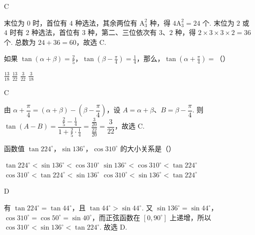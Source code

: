\begin{answer}
C
\end{answer}

\begin{solution}
末位为 \(0\) 时，首位有 \(4\) 种选法，其余两位有 \(\mathrm A_3^2\) 种，得 \(4\mathrm A_3^2=24\) 个. 末位为 \(2\) 或 \(4\) 时有 \(2\) 种选法，首位有 \(3\) 种，第二、三位依次有 \(3\)、\(2\) 种，得 \(2\times3\times3\times2=36\) 个. 总数为 \(24+36=60\)，故选 C.
\end{solution}

\begin{problem}
如果 \(\tan(\alpha + \beta) = \frac{2}{5}\)，\(\tan\left(\beta - \frac{\pi}{4}\right) = \frac{1}{4}\)，那么，\(\tan\left(\alpha + \frac{\pi}{4}\right)=\)（\quad）

\choices
    {\(\frac{13}{18}\)}
    {\(\frac{13}{22}\)}
    {\(\frac{3}{22}\)}
    {\(\frac{3}{18}\)}
\end{problem}

\begin{answer}
C
\end{answer}

\begin{solution}
由 \(\alpha+\dfrac\pi4=(\alpha+\beta)-\left(\beta-\dfrac\pi4\right)\)，设 \(A=\alpha+\beta\)、\(B=\beta-\dfrac\pi4\). 则
\(\tan(A-B)=\dfrac{\frac25-\frac14}{1+\frac25\cdot\frac14}=\dfrac{\frac{3}{20}}{\frac{22}{20}}=\dfrac3{22}\)，故选 C.
\end{solution}

\begin{problem}
函数值 \(\tan 224^{\circ}\)，\(\sin 136^{\circ}\)，\(\cos 310^{\circ}\) 的大小关系是（\quad）

\choices
    {\(\tan 224^{\circ} < \sin 136^{\circ} < \cos 310^{\circ}\)}
    {\(\sin 136^{\circ} < \cos 310^{\circ} < \tan 224^{\circ}\)}
    {\(\cos 310^{\circ} < \tan 224^{\circ} < \sin 136^{\circ}\)}
    {\(\cos 310^{\circ} < \sin 136^{\circ} < \tan 224^{\circ}\)}
\end{problem}

\begin{answer}
D
\end{answer}

\begin{solution}
有 \(\tan224^{\circ}=\tan44^{\circ}\)，且 \(\tan44^{\circ}>\sin44^{\circ}\). 又 \(\sin136^{\circ}=\sin44^{\circ}\)，\(\cos310^{\circ}=\cos50^{\circ}=\sin40^{\circ}\)，而正弦函数在 \([0,90^{\circ}]\) 上递增，所以 \(\cos310^{\circ}<\sin136^{\circ}<\tan224^{\circ}\). 故选 D.
\end{solution}

